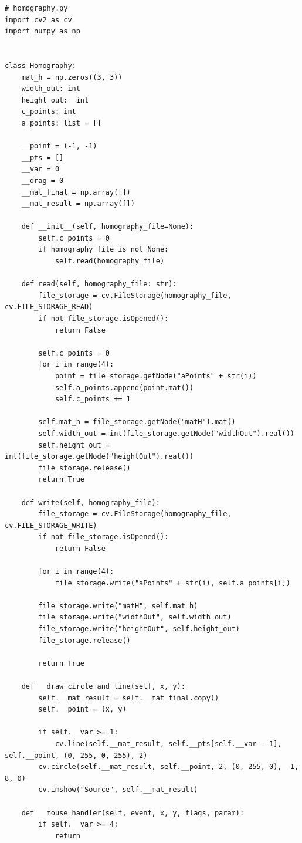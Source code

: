 \documentclass[a4paper, 12pt]{article}
\begin{document}
	\begin{lstlisting}
# homography.py
import cv2 as cv
import numpy as np


class Homography:
    mat_h = np.zeros((3, 3))
    width_out: int
    height_out:  int
    c_points: int
    a_points: list = []

    __point = (-1, -1)
    __pts = []
    __var = 0
    __drag = 0
    __mat_final = np.array([])
    __mat_result = np.array([])

    def __init__(self, homography_file=None):
        self.c_points = 0
        if homography_file is not None:
            self.read(homography_file)

    def read(self, homography_file: str):
        file_storage = cv.FileStorage(homography_file, cv.FILE_STORAGE_READ)
        if not file_storage.isOpened():
            return False

        self.c_points = 0
        for i in range(4):
            point = file_storage.getNode("aPoints" + str(i))
            self.a_points.append(point.mat())
            self.c_points += 1

        self.mat_h = file_storage.getNode("matH").mat()
        self.width_out = int(file_storage.getNode("widthOut").real())
        self.height_out = int(file_storage.getNode("heightOut").real())
        file_storage.release()
        return True

    def write(self, homography_file):
        file_storage = cv.FileStorage(homography_file, cv.FILE_STORAGE_WRITE)
        if not file_storage.isOpened():
            return False

        for i in range(4):
            file_storage.write("aPoints" + str(i), self.a_points[i])

        file_storage.write("matH", self.mat_h)
        file_storage.write("widthOut", self.width_out)
        file_storage.write("heightOut", self.height_out)
        file_storage.release()

        return True

    def __draw_circle_and_line(self, x, y):
        self.__mat_result = self.__mat_final.copy()
        self.__point = (x, y)

        if self.__var >= 1:
            cv.line(self.__mat_result, self.__pts[self.__var - 1], self.__point, (0, 255, 0, 255), 2)
        cv.circle(self.__mat_result, self.__point, 2, (0, 255, 0), -1, 8, 0)
        cv.imshow("Source", self.__mat_result)

    def __mouse_handler(self, event, x, y, flags, param):
        if self.__var >= 4:
            return


\end{lstlisting}
\end{document}
